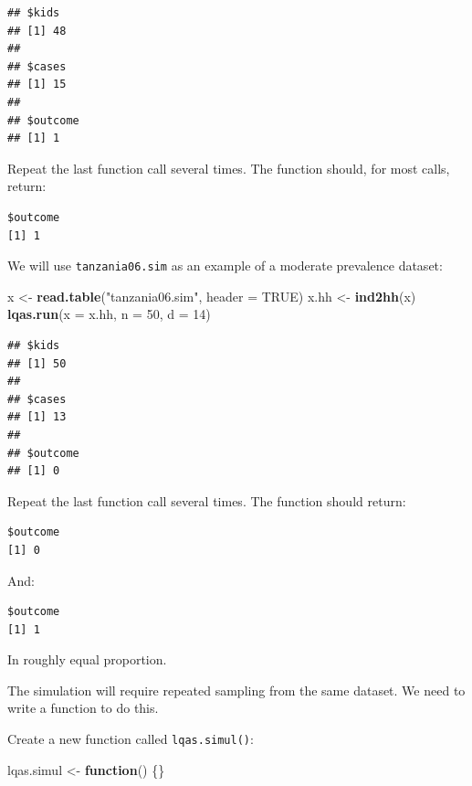 \documentclass[12pt,a4paper]{book}
\newenvironment{Shaded}{\begin{snugshade}}{\end{snugshade}}
\newcommand{\KeywordTok}[1]{\textcolor[rgb]{0.13,0.29,0.53}{\textbf{#1}}}
\newcommand{\DataTypeTok}[1]{\textcolor[rgb]{0.13,0.29,0.53}{#1}}
\newcommand{\DecValTok}[1]{\textcolor[rgb]{0.00,0.00,0.81}{#1}}
\newcommand{\StringTok}[1]{\textcolor[rgb]{0.31,0.60,0.02}{#1}}
\newcommand{\OtherTok}[1]{\textcolor[rgb]{0.56,0.35,0.01}{#1}}
\newcommand{\ControlFlowTok}[1]{\textcolor[rgb]{0.13,0.29,0.53}{\textbf{#1}}}
\newcommand{\NormalTok}[1]{#1}
\theoremstyle{definition}
\theoremstyle{definition}
\theoremstyle{definition}
\theoremstyle{remark}
\begin{document}
\begin{verbatim}
## $kids
## [1] 48
## 
## $cases
## [1] 15
## 
## $outcome
## [1] 1
\end{verbatim}

Repeat the last function call several times. The function should, for
most calls, return:

\begin{verbatim}
$outcome
[1] 1
\end{verbatim}

We will use \texttt{tanzania06.sim} as an example of a moderate
prevalence dataset:

\begin{Shaded}
\begin{Highlighting}[]
\NormalTok{x <-}\StringTok{ }\KeywordTok{read.table}\NormalTok{(}\StringTok{"tanzania06.sim"}\NormalTok{, }\DataTypeTok{header =} \OtherTok{TRUE}\NormalTok{)}
\NormalTok{x.hh <-}\StringTok{ }\KeywordTok{ind2hh}\NormalTok{(x)}
\KeywordTok{lqas.run}\NormalTok{(}\DataTypeTok{x =}\NormalTok{ x.hh, }\DataTypeTok{n =} \DecValTok{50}\NormalTok{, }\DataTypeTok{d =} \DecValTok{14}\NormalTok{)}
\end{Highlighting}
\end{Shaded}

\begin{verbatim}
## $kids
## [1] 50
## 
## $cases
## [1] 13
## 
## $outcome
## [1] 0
\end{verbatim}

Repeat the last function call several times. The function should return:

\begin{verbatim}
$outcome
[1] 0
\end{verbatim}

And:

\begin{verbatim}
$outcome
[1] 1
\end{verbatim}

In roughly equal proportion.

The simulation will require repeated sampling from the same dataset. We
need to write a function to do this.

Create a new function called \texttt{lqas.simul()}:

\begin{Shaded}
\begin{Highlighting}[]
\NormalTok{lqas.simul <-}\StringTok{ }\ControlFlowTok{function}\NormalTok{() \{\}}
\end{Highlighting}
\end{Shaded}
\end{document}
